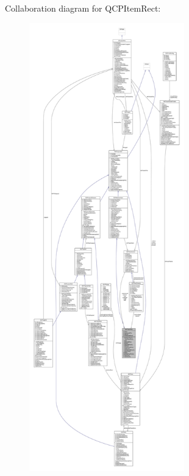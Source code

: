 Collaboration diagram for Q\+C\+P\+Item\+Rect\+:\nopagebreak
\begin{figure}[H]
\begin{center}
\leavevmode
\includegraphics[height=550pt]{class_q_c_p_item_rect__coll__graph}
\end{center}
\end{figure}
